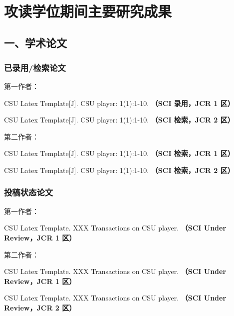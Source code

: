 {~}
\vspace{-10pt}
\section{攻读学位期间主要研究成果} %

\ifblindreview
\fi
\subsection*{一、学术论文}

\ifblindreview



\subsubsection*{已录用/检索论文}
第一作者：
\begin{enumerate}[label={[\arabic*]},itemindent=2em,wide]
\item CSU Latex Template[J]. CSU player: 1(1):1-10. {\bfseries \heiti（SCI 录用，JCR 1 区）}
\item CSU Latex Template[J]. CSU player: 1(1):1-10. {\bfseries \heiti（SCI 检索，JCR 2 区）}
\end{enumerate}
第二作者：
\begin{enumerate}[label={[\arabic*]},itemindent=2em,wide]
\item CSU Latex Template[J]. CSU player: 1(1):1-10. {\bfseries \heiti（SCI 检索，JCR 1 区）}
\item CSU Latex Template[J]. CSU player: 1(1):1-10. {\bfseries \heiti（SCI 检索，JCR 2 区）}
\end{enumerate}
\subsubsection*{投稿状态论文}
第一作者：
\begin{enumerate}[label={[\arabic*]},itemindent=2em,wide]
\item CSU Latex Template. XXX Transactions on CSU player. {\bfseries \heiti（SCI Under Review，JCR 1 区）}
\end{enumerate}
第二作者：
\begin{enumerate}[label={[\arabic*]},itemindent=2em,wide]
\item CSU Latex Template. XXX Transactions on CSU player. {\bfseries \heiti（SCI Under Review，JCR 1 区）}
\item CSU Latex Template. XXX Transactions on CSU player. {\bfseries \heiti（SCI Under Review，JCR 2 区）}
\end{enumerate}


